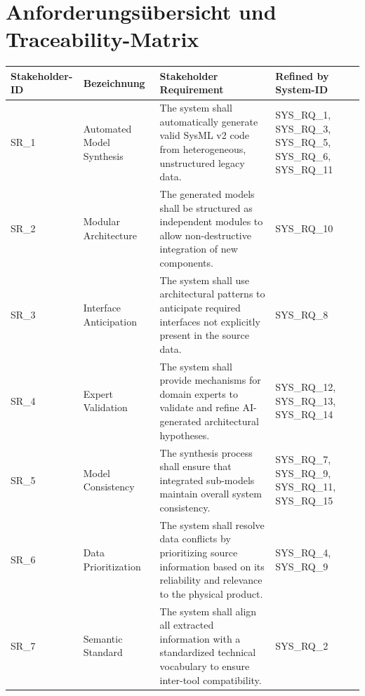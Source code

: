 \documentclass{article}
\begin{document}
\section*{Anforderungsübersicht und Traceability-Matrix}

\begin{table}[ht]
\small
\centering
\begin{tabularx}{\textwidth}{@{} l X X X @{}}
\toprule
\textbf{Stakeholder-ID} & \textbf{Bezeichnung} & \textbf{Stakeholder Requirement} & \textbf{Refined by System-ID} \\
\midrule

SR\_1 & Automated Model Synthesis &
The system shall automatically generate valid SysML v2 code from heterogeneous, unstructured legacy data. &
SYS\_RQ\_1, SYS\_RQ\_3, SYS\_RQ\_5, SYS\_RQ\_6, SYS\_RQ\_11 \\

\addlinespace
SR\_2 & Modular Architecture &
The generated models shall be structured as independent modules to allow non-destructive integration of new components. &
SYS\_RQ\_10 \\

\addlinespace
SR\_3 & Interface Anticipation &
The system shall use architectural patterns to anticipate required interfaces not explicitly present in the source data. &
SYS\_RQ\_8 \\

\addlinespace
SR\_4 & Expert Validation &
The system shall provide mechanisms for domain experts to validate and refine AI-generated architectural hypotheses. &
SYS\_RQ\_12, SYS\_RQ\_13, SYS\_RQ\_14 \\

\addlinespace
SR\_5 & Model Consistency &
The synthesis process shall ensure that integrated sub-models maintain overall system consistency. &
SYS\_RQ\_7, SYS\_RQ\_9, SYS\_RQ\_11, SYS\_RQ\_15 \\

\addlinespace
SR\_6 & Data Prioritization &
The system shall resolve data conflicts by prioritizing source information based on its reliability and relevance to the physical product. &
SYS\_RQ\_4, SYS\_RQ\_9 \\

\addlinespace
SR\_7 & Semantic Standard &
The system shall align all extracted information with a standardized technical vocabulary to ensure inter-tool compatibility. &
SYS\_RQ\_2 \\

\bottomrule
\end{tabularx}
\end{table}
\newpage
\end{document}
